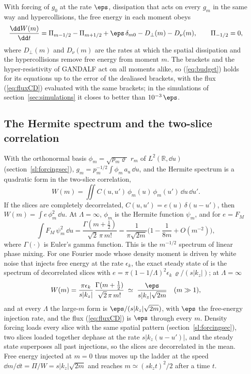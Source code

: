 With forcing of $g_0$ at the rate $\eps$, dissipation that acts on every $g_m$ in the same way and hypercollisions, the free energy in each moment obeys
\begin{equation}\label{eq:budget}
  \frac{\dd W(m)}{\dd t}=\Pi_{m-1/2}-\Pi_{m+1/2}+\eps\,\delta_{m0}-D_\perp(m)-D_\nu(m),\qquad \Pi_{-1/2}=0,
\end{equation}
where $D_\perp(m)$ and $D_\nu(m)$ are the rates at which the spatial dissipation and the hypercollisions remove free energy from moment $m$. The brackets and the hyper-resistivity of GANDALF act on all moments alike, so (\ref{eq:budget}) holds for its equations up to the error of the dealiased brackets, with the flux (\ref{eq:fluxCD}) evaluated with the same brackets; in the simulations of section~\ref{sec:simulations} it closes to better than $10^{-3}\,\eps$.

\subsection{The Hermite spectrum and the two-slice correlation}\label{hm:dictionary}

With the orthonormal basis $\phi_m=\sqrt{p_m\varrho}\;r_m$ of $L^2(\mathbb R,\dd u)$ (section~\ref{sl:forcingsec}), $g_m=p_m^{-1/2}\int\phi_m\,a_u\,\dd u$, and the Hermite spectrum is a quadratic form in the two-slice correlation,
\begin{equation}\label{eq:dictionary}
  W(m)=\iint C(u,u')\,\phi_m(u)\,\phi_m(u')\,\dd u\,\dd u' .
\end{equation}
If the slices are completely decorrelated, $C(u,u')=e(u)\,\delta(u-u')$, then $W(m)=\int e\,\phi_m^2\,\dd u$. At $\Lambda=\infty$, $\phi_m$ is the Hermite function $\psi_m$, and for $e=F_M$
\begin{equation}\label{eq:prefactor}
  \int F_M\,\psi_m^2\,\dd u=\frac{\Gamma(m+\frac12)}{\sqrt2\,\pi\,m!}=\frac{1}{\pi\sqrt{2m}}\Big(1-\frac{1}{8m}+O(m^{-2})\Big),
\end{equation}
where $\Gamma(\cdot)$ is Euler's gamma function. This is the $m^{-1/2}$ spectrum of linear phase mixing. For one Fourier mode whose density moment is driven by white noise that injects free energy at the rate $\epsilon_k$, the exact steady state of \citet[eq.~4.10]{Kanekar2015} is the spectrum of decorrelated slices with $e=\pi(1-1/\Lambda)^2\epsilon_k\,\varrho/(s|k_z|)$; at $\Lambda=\infty$
\begin{equation}\label{eq:linforced}
  W(m)=\frac{\pi\epsilon_k}{s|k_z|}\,\frac{\Gamma(m+\frac12)}{\sqrt2\,\pi\,m!}\;\simeq\;\frac{\eps}{s|k_z|\sqrt{2m}}\quad(m\gg1),
\end{equation}
and at every $\Lambda$ the large-$m$ form is $\eps/(s|k_z|\sqrt{2m})$, with $\eps$ the free-energy injection rate, and the flux (\ref{eq:fluxCD}) is $\eps$ through every $m$. Density forcing loads every slice with the same spatial pattern (section~\ref{sl:forcingsec}), two slices loaded together dephase at the rate $s|k_z(u-u')|$, and the steady state superposes all past injections, so the slices are decorrelated in the mean. Free energy injected at $m=0$ thus moves up the ladder at the speed $\dd m/\dd t=\Pi/W=s|k_z|\sqrt{2m}$ and reaches $m\simeq(sk_zt)^2/2$ after a time $t$.

